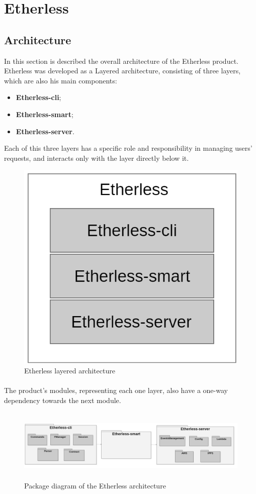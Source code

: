 \section{Etherless}
	\subsection{Architecture} %
	In this section is described the overall architecture of the Etherless product. \\
	Etherless was developed as a Layered architecture, consisting of three layers, which are also his main components:
	\begin{itemize}
		\item \textbf{Etherless-cli};
		\item \textbf{Etherless-smart};
		\item \textbf{Etherless-server}.
	\end{itemize}
	Each of this three layers has a specific role and responsibility in managing users' requests, and interacts only with the layer directly below it.
	\begin{figure} [h!]
		\centering
		\includegraphics[width=0.7\linewidth]{diagrammi/generali/LayeredArchitecture}
		\caption{Etherless layered architecture}
	\end{figure}
	\pagebreak
	\paragraph{} The product's modules, representing each one layer, also have a one-way dependency towards the next module.
	\begin{figure} [h!]
		\centering
		\includegraphics[width=15cm, height=3.5cm]{diagrammi/generali/Etherless_package}
		\caption{Package diagram of the Etherless architecture}
	\end{figure}
